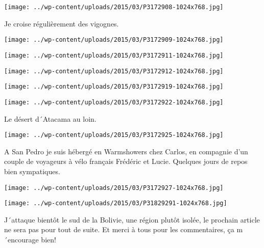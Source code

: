 \centerline{\texttt{[image: ../wp-content/uploads/2015/03/P3172908-1024x768.jpg]} } 
 \newline
 Je croise régulièrement des vigognes.\newline
\centerline{\texttt{[image: ../wp-content/uploads/2015/03/P3172909-1024x768.jpg]} } 
 \newline
 \newline
\centerline{\texttt{[image: ../wp-content/uploads/2015/03/P3172911-1024x768.jpg]} } 
 \newline
 \newline
\centerline{\texttt{[image: ../wp-content/uploads/2015/03/P3172912-1024x768.jpg]} } 
 \newline
 \newline
\centerline{\texttt{[image: ../wp-content/uploads/2015/03/P3172919-1024x768.jpg]} } 
 \newline
 \newline
\centerline{\texttt{[image: ../wp-content/uploads/2015/03/P3172922-1024x768.jpg]} } 
 \newline
 Le désert d´Atacama au loin. \newline
 \newline
\centerline{\texttt{[image: ../wp-content/uploads/2015/03/P3172925-1024x768.jpg]} } 
 \newline
 A San Pedro je suis hébergé en Warmshowers chez Carlos, en compagnie d'un couple de voyageurs à vélo français Frédéric et Lucie. Quelques jours de repos bien sympatiques. \newline
 \newline
\centerline{\texttt{[image: ../wp-content/uploads/2015/03/P3172927-1024x768.jpg]} } 
 \newline
 \newline
\centerline{\texttt{[image: ../wp-content/uploads/2015/03/P31829291-1024x768.jpg]} } 
J´attaque bientôt le sud de la Bolivie, une région plutôt isolée, le prochain article ne sera pas pour tout de suite. \newline
 Et merci à tous pour les commentaires, ça m´encourage bien! \newline
  \newline

\newpage
 
